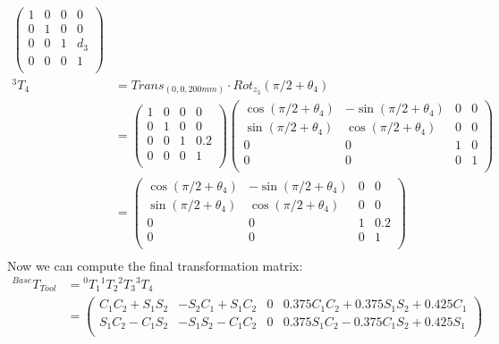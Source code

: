 \documentclass[a4paper,11pt]{article}
\begin{document}
\begin {enumerate}
\begin{enumerate}
\begin{align*}
\begin{pmatrix}
                1 & 0 & 0 & 0\\
                0 & 1 & 0 & 0\\
                0 & 0 & 1 & d_3\\
                0 & 0 & 0 & 1\\
            \end{pmatrix}\\
            {^3T_4} &= Trans_{(0,0,200mm)} \cdot Rot_{z_3}(\pi/2 + \theta_4)\\
            &= \begin{pmatrix}
                1 & 0 & 0 & 0\\
                0 & 1 & 0 & 0\\
                0 & 0 & 1 & 0.2\\
                0 & 0 & 0 & 1\\
            \end{pmatrix}
            \begin{pmatrix}
                \cos(\pi/2 + \theta_4) & -\sin(\pi/2 + \theta_4) & 0 & 0\\
                \sin(\pi/2 + \theta_4) & \cos(\pi/2 + \theta_4) & 0 & 0\\
                0 & 0 & 1 & 0\\
                0 & 0 & 0 & 1\\
            \end{pmatrix}\\
            &= \begin{pmatrix}
                \cos(\pi/2 + \theta_4) & -\sin(\pi/2 + \theta_4) & 0 & 0\\
                \sin(\pi/2 + \theta_4) & \cos(\pi/2 + \theta_4) & 0 & 0\\
                0 & 0 & 1 & 0.2\\
                0 & 0 & 0 & 1\\
            \end{pmatrix}\\
        \end{align*}
        Now we can compute the final transformation matrix:
        \begin{align*}
            {^{Base}T_{Tool}} &= {^0T_1}{^1T_2}{^2T_3}{^3T_4}\\
            &= \begin{pmatrix}
                C_1C_2 + S_1S_2 & -S_2C_1 + S_1C_2 & 0 & 0.375C_1C_2 + 0.375S_1S_2 + 0.425C_1\\
                S_1C_2-C_1S_2 & -S_1S_2-C_1C_2 & 0 & 0.375S_1C_2-0.375C_1S_2+0.425S_1\\

\end{pmatrix}
\end{align*}
\end{enumerate}
\end{enumerate}
\end{document}
